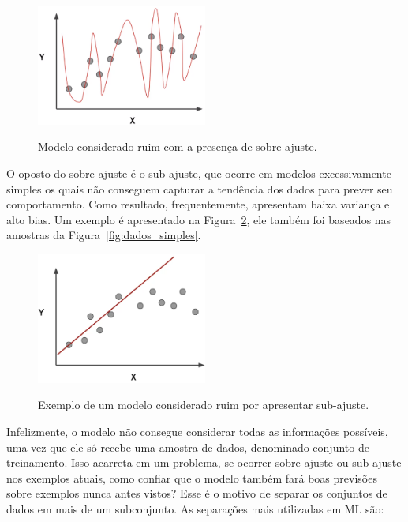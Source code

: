             \begin{figure}[H]
                \centering
                \caption{Modelo considerado ruim com a presença de sobre-ajuste.}
                \includegraphics[width=0.5\textwidth]{fig/2-fundamentacao/overfitting/overfitting.png}
                \label{fig:overfitting}
            \end{figure}
            
            O oposto do sobre-ajuste é o sub-ajuste, que ocorre em modelos excessivamente simples os quais não conseguem capturar a tendência dos dados para prever seu comportamento. Como resultado, frequentemente, apresentam baixa variança e alto bias. Um exemplo é apresentado na Figura~\ref{fig:underfitting}, ele também foi baseados nas amostras da Figura~\ref{fig:dados_simples}.
            
            \begin{figure}[H]
                \centering
                \caption{Exemplo de um modelo considerado ruim por apresentar sub-ajuste.}
                \includegraphics[width=0.5\textwidth]{fig/2-fundamentacao/overfitting/unterfitting.png}
                \label{fig:underfitting}
            \end{figure}
            
            Infelizmente, o modelo não consegue considerar todas as informações possíveis, uma vez que ele só recebe uma amostra de dados, denominado conjunto de treinamento. Isso acarreta em um problema, se ocorrer sobre-ajuste ou sub-ajuste nos exemplos atuais, como confiar que o modelo também fará boas previsões sobre exemplos nunca antes vistos? Esse é o motivo de separar os conjuntos de dados em mais de um subconjunto. As separações mais utilizadas em ML são:
            
